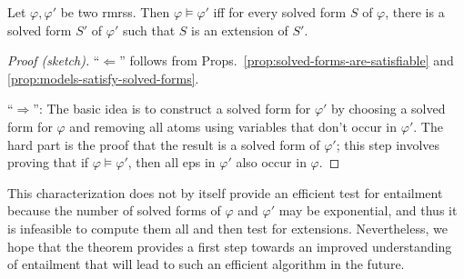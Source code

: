 \begin{thm}\label{thm:big-one}
  Let $\varphi, \varphi'$ be two {\sc rmrs}s.  Then $\varphi \models
  \varphi'$ iff for every solved form $S$ of $\varphi$, there is a
  solved form $S'$ of $\varphi'$ such that $S$ is an extension of
  $S'$. 
\end{thm}
\begin{proof}[Proof (sketch)]
``$\Leftarrow$'' follows from
Props.~\ref{prop:solved-forms-are-satisfiable} and
\ref{prop:models-satisfy-solved-forms}.

``$\Rightarrow$'': The basic idea is to construct a solved form for
$\varphi'$ by choosing a solved form for $\varphi$ and removing all
atoms using variables that don't occur in $\varphi'$.  The hard part
is the proof that the result is a solved form of $\varphi'$; this step
involves proving that if $\varphi \models \varphi'$, then all {\sc ep}s in
$\varphi'$ also occur in $\varphi$.  
\end{proof}

This characterization does not by itself provide an efficient test for
entailment because the number of solved forms of $\varphi$ and
$\varphi'$ may be exponential, and thus it is infeasible to compute
them all and then test for extensions.  Nevertheless, we hope that the
theorem provides a first step towards an improved understanding of
entailment that will lead to such an efficient algorithm in the
future.


